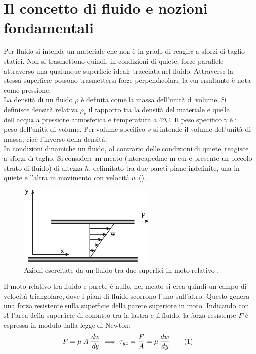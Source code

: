 \section{Il concetto di fluido e nozioni fondamentali}
Per fluido si intende un materiale che non è in grado di reagire a sforzi di taglio statici. Non si trasmettono quindi, in condizioni di quiete, forze parallele attraverso una qualunque superficie ideale tracciata nel fluido. Attraverso la stessa superficie possono trasmettersi forze perpendicolari, la cui risultante è nota come pressione.\\
La densità di un fluido \(\rho\) è definita come la massa dell'unità di volume. Si definisce densità relativa \(\rho_r\) il rapporto tra la densità del materiale e quella dell'acqua a pressione atmosferica e temperatura a 4°C. Il peso specifico \(\gamma\) è il peso dell'unità di volume. Per volume specifico \(v\) si intende il volume dell'unità di massa, cioè l'inverso della densità. \\
In condizioni dinamiche un fluido, al contrario delle condizioni di quiete, reagisce a sforzi di taglio. Si consideri un meato (intercapedine in cui è presente un piccolo strato di fluido) di altezza \(h\), delimitato tra due pareti piane indefinite, una in quiete e l'altra in movimento con velocità \(w\) ().
\begin{figure}[htbp] %
    \centering
    \includegraphics[width=0.6\textwidth]{fig/fluidodinamica/meato.eps}
    \caption{Azioni esercitate da un fluido tra due superfici in moto relativo \parencite{guglielmini2004lezioni}.} 
    \label{fig:meato}
\end{figure}
Il moto relativo tra fluido e parete è nullo, nel meato si crea quindi un campo di velocità triangolare, dove i piani di fluido scorrono l'uno sull'altro. Questo genera una forza resistente sulla superficie della parete superiore in moto. Indicando con \(A\) l'area della superficie di contatto tra  la lastra e il fluido, la forza resistente \(F\) è espressa in modulo dalla legge di Newton:
\[F= \mu \; A \; \frac{dw}{dy} \implies \tau_{yx} = \frac{F}{A} = \mu \; \frac{dw}{dy} \addtag \label{eq:newton} \]
